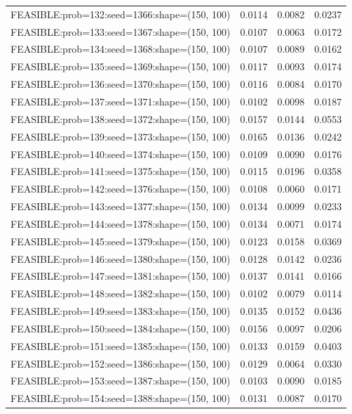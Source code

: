 \begin{longtable}{lccc}
FEASIBLE:prob=132:seed=1366:shape=(150, 100) &   0.0114 & 0.0082 & 0.0237 \\
FEASIBLE:prob=133:seed=1367:shape=(150, 100) &   0.0107 & 0.0063 & 0.0172 \\
FEASIBLE:prob=134:seed=1368:shape=(150, 100) &   0.0107 & 0.0089 & 0.0162 \\
FEASIBLE:prob=135:seed=1369:shape=(150, 100) &   0.0117 & 0.0093 & 0.0174 \\
FEASIBLE:prob=136:seed=1370:shape=(150, 100) &   0.0116 & 0.0084 & 0.0170 \\
FEASIBLE:prob=137:seed=1371:shape=(150, 100) &   0.0102 & 0.0098 & 0.0187 \\
FEASIBLE:prob=138:seed=1372:shape=(150, 100) &   0.0157 & 0.0144 & 0.0553 \\
FEASIBLE:prob=139:seed=1373:shape=(150, 100) &   0.0165 & 0.0136 & 0.0242 \\
FEASIBLE:prob=140:seed=1374:shape=(150, 100) &   0.0109 & 0.0090 & 0.0176 \\
FEASIBLE:prob=141:seed=1375:shape=(150, 100) &   0.0115 & 0.0196 & 0.0358 \\
FEASIBLE:prob=142:seed=1376:shape=(150, 100) &   0.0108 & 0.0060 & 0.0171 \\
FEASIBLE:prob=143:seed=1377:shape=(150, 100) &   0.0134 & 0.0099 & 0.0233 \\
FEASIBLE:prob=144:seed=1378:shape=(150, 100) &   0.0134 & 0.0071 & 0.0174 \\
FEASIBLE:prob=145:seed=1379:shape=(150, 100) &   0.0123 & 0.0158 & 0.0369 \\
FEASIBLE:prob=146:seed=1380:shape=(150, 100) &   0.0128 & 0.0142 & 0.0236 \\
FEASIBLE:prob=147:seed=1381:shape=(150, 100) &   0.0137 & 0.0141 & 0.0166 \\
FEASIBLE:prob=148:seed=1382:shape=(150, 100) &   0.0102 & 0.0079 & 0.0114 \\
FEASIBLE:prob=149:seed=1383:shape=(150, 100) &   0.0135 & 0.0152 & 0.0436 \\
FEASIBLE:prob=150:seed=1384:shape=(150, 100) &   0.0156 & 0.0097 & 0.0206 \\
FEASIBLE:prob=151:seed=1385:shape=(150, 100) &   0.0133 & 0.0159 & 0.0403 \\
FEASIBLE:prob=152:seed=1386:shape=(150, 100) &   0.0129 & 0.0064 & 0.0330 \\
FEASIBLE:prob=153:seed=1387:shape=(150, 100) &   0.0103 & 0.0090 & 0.0185 \\
FEASIBLE:prob=154:seed=1388:shape=(150, 100) &   0.0131 & 0.0087 & 0.0170 \\

\end{longtable}
